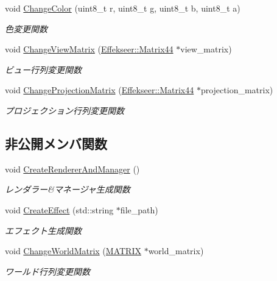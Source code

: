 \begin{DoxyCompactItemize}
void \mbox{\hyperlink{class_effekseer_object_aa3fbff4e565c771d1b8e2a83b197294b}{Change\+Color}} (uint8\+\_\+t r, uint8\+\_\+t g, uint8\+\_\+t b, uint8\+\_\+t a)
\begin{DoxyCompactList}\small\item\em 色変更関数 \end{DoxyCompactList}\item 
void \mbox{\hyperlink{class_effekseer_object_a822247e8b5effa83ccf7239283f83326}{Change\+View\+Matrix}} (\mbox{\hyperlink{struct_effekseer_1_1_matrix44}{Effekseer\+::\+Matrix44}} $\ast$view\+\_\+matrix)
\begin{DoxyCompactList}\small\item\em ビュー行列変更関数 \end{DoxyCompactList}\item 
void \mbox{\hyperlink{class_effekseer_object_ad8ad42a6cf622ae1ef145f66af3af7c3}{Change\+Projection\+Matrix}} (\mbox{\hyperlink{struct_effekseer_1_1_matrix44}{Effekseer\+::\+Matrix44}} $\ast$projection\+\_\+matrix)
\begin{DoxyCompactList}\small\item\em プロジェクション行列変更関数 \end{DoxyCompactList}\end{DoxyCompactItemize}
\subsection*{非公開メンバ関数}
\begin{DoxyCompactItemize}
\item 
void \mbox{\hyperlink{class_effekseer_object_a6b7b077ec4d0892add6e0958dae833db}{Create\+Renderer\+And\+Manager}} ()
\begin{DoxyCompactList}\small\item\em レンダラー\&マネージャ生成関数 \end{DoxyCompactList}\item 
void \mbox{\hyperlink{class_effekseer_object_af55a8edc8ff64371e28fe3e00b6af7ae}{Create\+Effect}} (std\+::string $\ast$file\+\_\+path)
\begin{DoxyCompactList}\small\item\em エフェクト生成関数 \end{DoxyCompactList}\item 
void \mbox{\hyperlink{class_effekseer_object_a7bc76cdd2fb6f4ff38e20ec9c21bdef5}{Change\+World\+Matrix}} (\mbox{\hyperlink{_matrix_8h_a032295cd9fb1b711757c90667278e744}{M\+A\+T\+R\+IX}} $\ast$world\+\_\+matrix)
\begin{DoxyCompactList}\small\item\em ワールド行列変更関数 \end{DoxyCompactList}\end{DoxyCompactItemize}
